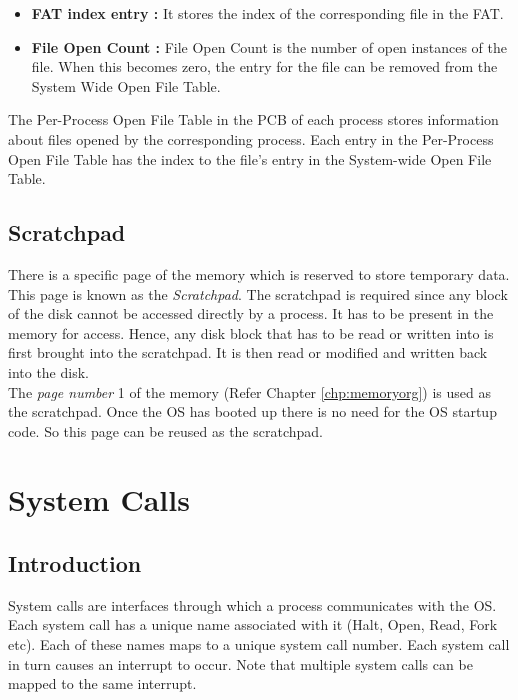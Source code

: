 \documentclass[10pt]{report}
\begin{document}
	 \begin{itemize}
		 \item \textbf{FAT index entry :}  It stores the index of the corresponding file in the FAT.

		 \item \textbf{File Open Count :} File Open Count is the number of open instances of the file. When this becomes zero, the entry for the file can be removed from the System Wide Open File Table.
	 \end{itemize}

The Per-Process Open File Table in the PCB of each process stores information about files opened by the corresponding process. Each entry in the Per-Process Open File Table has the index to the file's entry  in the  System-wide Open File Table.

\section{Scratchpad}
\label{sec:scratchpad}
There is a specific page of the memory which is reserved to store temporary data. This page is known as the \textit{Scratchpad}. The scratchpad is required since any block of the disk cannot be accessed directly  by a process. It has to be present in the memory for access. Hence, any disk block that has to be read or written into is first brought into the scratchpad. It is then read or modified and written back into the disk. \\

The \textit{page number} 1 of the memory (Refer Chapter \ref{chp:memoryorg}) is used as the scratchpad. Once the OS has booted up there is no need for the OS startup code. So this page can be reused as the scratchpad.


\chapter{System Calls}
\label{chp:system_calls}

\section{Introduction}
System calls are interfaces through which a process communicates with the OS. Each system call has a unique name associated with it (Halt, Open, Read, Fork etc). Each of these names maps to a unique system call number. Each system call in turn causes an interrupt to occur. Note that multiple system calls can be mapped to the same interrupt.
\end{document}
